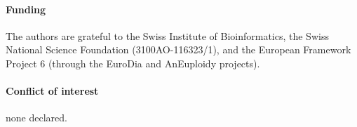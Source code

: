 \documentclass[round]{bioinfo}
\begin{document}

\paragraph{Funding\textcolon} The authors are grateful to the Swiss
Institute of Bioinformatics, the Swiss National Science Foundation
(3100AO-116323/1), and the European Framework Project 6 (through
the EuroDia and AnEuploidy projects).

\paragraph{Conflict of interest\textcolon} none declared.
\end{document}
